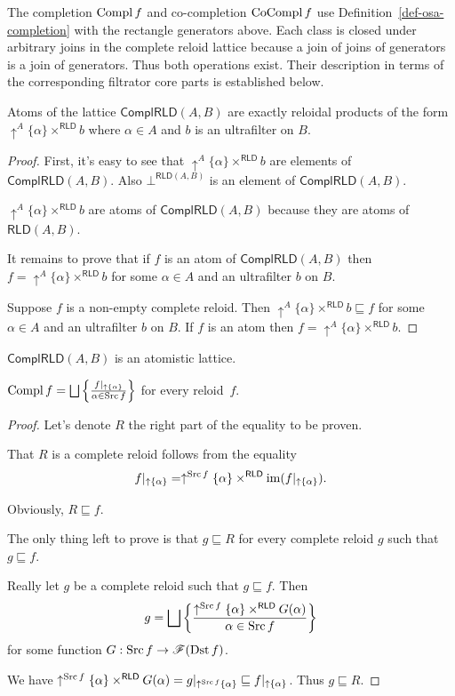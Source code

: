 The completion $\operatorname{Compl} f$ and co-completion $\operatorname{CoCompl} f$ use
Definition~\ref{def-osa-completion} with the rectangle generators
above. Each class is closed under arbitrary joins in the complete
reloid lattice because a join of joins of generators is a join of
generators. Thus both operations exist. Their description in terms
of the corresponding filtrator core parts is established below.

\begin{thm}
Atoms of the lattice $\mathsf{ComplRLD}(A,B)$ are exactly reloidal
products of the form $\uparrow^{A}\{\alpha\}\times^{\mathsf{RLD}}b$
where $\alpha\in A$ and $b$ is an ultrafilter on $B$.\end{thm}
\begin{proof}
First, it's easy to see that $\uparrow^{A}\{\alpha\}\times^{\mathsf{RLD}}b$
are elements of $\mathsf{ComplRLD}(A,B)$. Also $\bot^{\mathsf{RLD}(A,B)}$
is an element of $\mathsf{ComplRLD}(A,B)$.

$\uparrow^{A}\{\alpha\}\times^{\mathsf{RLD}}b$ are atoms of $\mathsf{ComplRLD}(A,B)$
because they are atoms of $\mathsf{RLD}(A,B)$.

It remains to prove that if $f$ is an atom of $\mathsf{ComplRLD}(A,B)$
then $f=\uparrow^{A}\{\alpha\}\times^{\mathsf{RLD}}b$ for some $\alpha\in A$
and an ultrafilter $b$ on $B$.

Suppose $f$ is a non-empty complete reloid. Then $\uparrow^{A}\{\alpha\}\times^{\mathsf{RLD}}b\sqsubseteq f$
for some $\alpha\in A$ and an ultrafilter $b$ on $B$. If $f$ is
an atom then $f=\uparrow^{A}\{\alpha\}\times^{\mathsf{RLD}}b$.\end{proof}
\begin{obvious}
$\mathsf{ComplRLD}(A,B)$ is an atomistic lattice.\end{obvious}
\begin{prop}
$\Compl f=\bigsqcup\setcond{f|_{\uparrow \{\alpha\}}}{\alpha\in\Src f}$
for every reloid~$f$.\end{prop}
\begin{proof}
Let's denote $R$ the right part of the equality to be proven.

That $R$ is a complete reloid follows from the equality
\[
f|_{\uparrow \{\alpha\}}=\uparrow^{\operatorname{Src} f}\{\alpha\}\times^{\mathsf{RLD}}\operatorname{im}(f|_{\uparrow \{\alpha\}}).
\]

Obviously, $R\sqsubseteq f$.

The only thing left to prove is that $g\sqsubseteq R$ for every complete
reloid $g$ such that $g\sqsubseteq f$.

Really let $g$ be a complete reloid such that $g\sqsubseteq f$.
Then
\[
g=\bigsqcup\setcond{\uparrow^{\Src f}\{\alpha\}\times^{\mathsf{RLD}}G(\alpha)}{\alpha\in\Src f}
\]
for some function $G:\operatorname{Src} f\rightarrow\mathscr{F}(\operatorname{Dst} f)$.

We have $\uparrow^{\operatorname{Src} f}\{\alpha\}\times^{\mathsf{RLD}}G(\alpha)=g|_{\uparrow^{\operatorname{Src} f}\{\alpha\}}\sqsubseteq f|_{\uparrow \{\alpha\}}$.
Thus $g\sqsubseteq R$.\end{proof}
